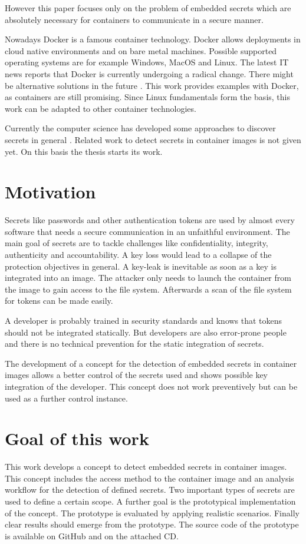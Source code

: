 However this paper focuses only on the problem of embedded secrets which are absolutely necessary for containers to communicate in a secure manner.

Nowadays Docker is a famous container technology. Docker allows deployments in cloud native environments and on bare metal machines. Possible supported operating systems are for example Windows, MacOS and Linux.
The latest IT news reports that Docker is currently undergoing a radical change. There might be alternative solutions in the future \cite{docker_heise}. This work provides examples with Docker, as containers are still promising. Since Linux fundamentals form the basis, this work can be adapted to other container technologies.

Currently the computer science has developed some approaches to discover secrets in general \cite{7180102}. Related work to detect secrets in container images is not given yet.
On this basis the thesis starts its work.

%
%
\section{Motivation}
\label{sec:intro:motivation}
Secrets like passwords and other authentication tokens are used by almost every software that needs a secure communication in an unfaithful environment. 
The main goal of secrets are to tackle challenges like confidentiality, integrity, authenticity and accountability. 
A key loss would lead to a collapse of the  protection objectives in general. A key-leak is inevitable as soon as a key is integrated into an image.
The attacker only needs to launch the container from the image to gain access to the file system. Afterwards a scan of the file system for tokens can be made easily. 

A developer is probably trained in security standards and knows that tokens should not be integrated statically. 
But developers are also error-prone people and there is no technical prevention for the static integration of secrets. 

The development of a concept for the detection of embedded secrets in container images allows a better control of the secrets used and shows possible key integration of the developer. 
This concept does not work preventively but can be used as a further control instance.%
%
\section{Goal of this work}
\label{sec:intro:goal}
This work develops a concept to detect embedded secrets in container images. 
This concept includes the access method to the container image and an analysis workflow for the detection of defined secrets. 
Two important types of secrets are used to define a certain scope. A further goal is the prototypical implementation of the concept. 
The prototype is evaluated by applying realistic scenarios.
Finally clear results should emerge from the prototype. 
The source code of the prototype is available on GitHub \cite{githublinse} and on the attached CD.

